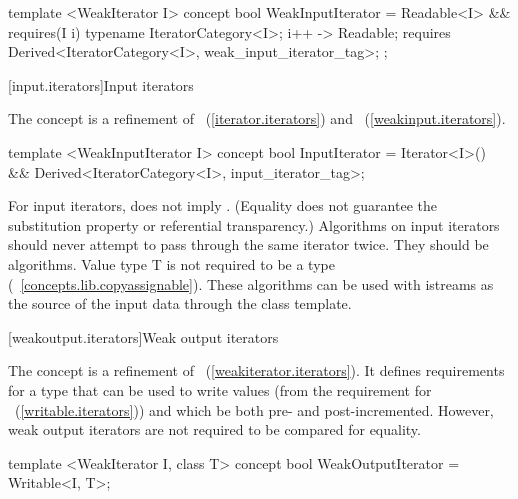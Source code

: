 \begin{addedblock}
\begin{codeblock}
template <WeakIterator I>
concept bool WeakInputIterator =
  Readable<I> &&
  requires(I i) {
    typename IteratorCategory<I>;
    { i++ } -> Readable;
    requires Derived<IteratorCategory<I>, weak_input_iterator_tag>;
  };
\end{codeblock}

\end{addedblock}

[input.iterators]{Input iterators}


\begin{addedblock}
\pnum
The  concept is a refinement of ~(\ref{iterator.iterators}) and
~(\ref{weakinput.iterators}).

\begin{codeblock}
template <WeakInputIterator I>
concept bool InputIterator =
  Iterator<I>() &&
  Derived<IteratorCategory<I>, input_iterator_tag>;
\end{codeblock}

\end{addedblock}

\pnum
\enternote
For input iterators,
does not imply
.
(Equality does not guarantee the substitution property or referential transparency.)
Algorithms on input iterators should never attempt to pass through the same iterator twice.
They should be
algorithms.
Value type T is not required to be a  type (~\ref{concepts.lib.copyassignable}).
These algorithms can be used with istreams as the source of the input data through the
class template.
\exitnote


[weakoutput.iterators]{Weak output iterators}


\begin{addedblock}
\pnum
The  concept is a refinement of
~(\ref{weakiterator.iterators}). It defines requirements for a type that
can be used to write values (from the requirement for
~(\ref{writable.iterators})) and which be both pre- and post-incremented. However,
weak output iterators are not required to be compared for equality.

\begin{codeblock}
template <WeakIterator I, class T>
concept bool WeakOutputIterator =
  Writable<I, T>;
\end{codeblock}
\end{addedblock}

